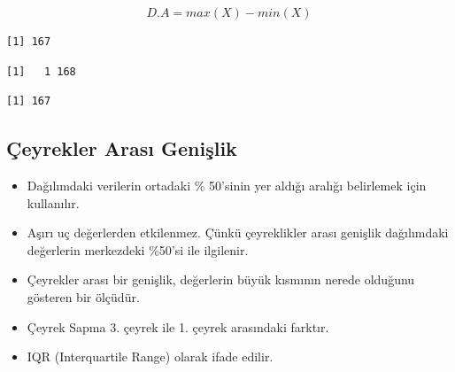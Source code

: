\documentclass[
  letterpaper,
  DIV=11,
  numbers=noendperiod]{scrreprt}
\newenvironment{Shaded}{\begin{snugshade}}{\end{snugshade}}
\newcommand{\AttributeTok}[1]{\textcolor[rgb]{0.40,0.45,0.13}{#1}}
\newcommand{\CommentTok}[1]{\textcolor[rgb]{0.37,0.37,0.37}{#1}}
\newcommand{\ConstantTok}[1]{\textcolor[rgb]{0.56,0.35,0.01}{#1}}
\newcommand{\DecValTok}[1]{\textcolor[rgb]{0.68,0.00,0.00}{#1}}
\newcommand{\FunctionTok}[1]{\textcolor[rgb]{0.28,0.35,0.67}{#1}}
\newcommand{\NormalTok}[1]{\textcolor[rgb]{0.00,0.23,0.31}{#1}}
\newcommand{\SpecialCharTok}[1]{\textcolor[rgb]{0.37,0.37,0.37}{#1}}
\begin{document}
\[D.A = max(X)-min(X)\]

\begin{Shaded}
\end{Shaded}

\begin{verbatim}
[1] 167
\end{verbatim}

\begin{Shaded}
\end{Shaded}

\begin{verbatim}
[1]   1 168
\end{verbatim}

\begin{Shaded}
\end{Shaded}

\begin{verbatim}
[1] 167
\end{verbatim}

\subsection*{Çeyrekler Arası
Genişlik}\label{uxe7eyrekler-arasux131-geniux15flik}

\begin{itemize}
\item
  Dağılımdaki verilerin ortadaki \% 50'sinin yer aldığı aralığı
  belirlemek için kullanılır.
\item
  Aşırı uç değerlerden etkilenmez. Çünkü çeyreklikler arası genişlik
  dağılımdaki değerlerin merkezdeki \%50'si ile ilgilenir.
\item
  Çeyrekler arası bir genişlik, değerlerin büyük kısmının nerede
  olduğunu gösteren bir ölçüdür.
\item
  Çeyrek Sapma 3. çeyrek ile 1. çeyrek arasındaki farktır.
\item
  IQR (Interquartile Range) olarak ifade edilir.
\end{itemize}
\end{document}
